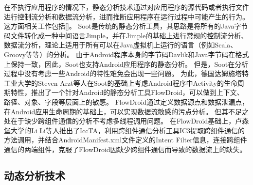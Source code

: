 在不执行应用程序的情况下，静态分析技术通过对应用程序的源代码或者执行文件进行控制流分析和数据流分析，进而推断应用程序在运行过程中可能产生的行为。
这方面相关工作包括[]。
Soot\cite{vallee1999soot}是传统的静态分析工具，其思路是将所有的Java字节码文件转化成一种中间语言Jimple，并在Jimple的基础上进行常规的控制流分析、数据流分析，理论上适用于所有可以在Java虚拟机上运行的语言（例如Scala、Groovy等等）的分析。
由于Android程序本身的字节码Davlik和Java字节码在格式上保持一致，因此，Soot也支持Android应用程序的静态分析。
但是，Soot在分析过程中没有考虑一些Android的特性难免会出现一些问题。
为此，德国达姆施塔特工业大学的Steven Arzt等人在Soot的基础上考虑Android程序中Activity的生命周期特性，推出了一个针对Android的静态分析工具FlowDroid\cite{arzt2014flowdroid}，可以做到上下文、路径、对象、字段等层面上的敏感。
FlowDroid通过定义数据源点和数据泄漏点，在Android应用生命周期的基础上，可以实现数据流敏感的污点分析。
但其不足之处在于缺少跨组件通信的分析不考虑多线程调用问题。
在FlowDroid基础上，卢森堡大学的Li Li等人推出了IccTA\cite{iccta}，利用跨组件通信分析工具IC3提取跨组件通信的方法调用，并结合AndroidManifest.xml文件定义的Intent Filter信息，连接跨组件通信的两端组件，克服了FlowDroid因缺少跨组件通信而导致的数据流上的缺失。





\subsection{动态分析技术}

